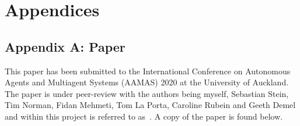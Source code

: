 \documentclass[sotoncolour]{uosproject}     %
\begin{document}
\mainmatter


\backmatter

\appendix
\chapter*{Appendices}
\section*{Appendix A: Paper} \label{sec:aamas_paper} %
This paper has been submitted to the International Conference on Autonomous Agents and Multiagent Systems (AAMAS)
2020 at the University of Auckland. The paper is under peer-review with the authors being myself, Sebastian Stein,
Tim Norman, Fidan Mehmeti, Tom La Porta, Caroline Rubein and Geeth Demel and within this project is referred to
as~\cite{FlexibleResourceAllocation}. A copy of the paper is found below.












\end{document}
